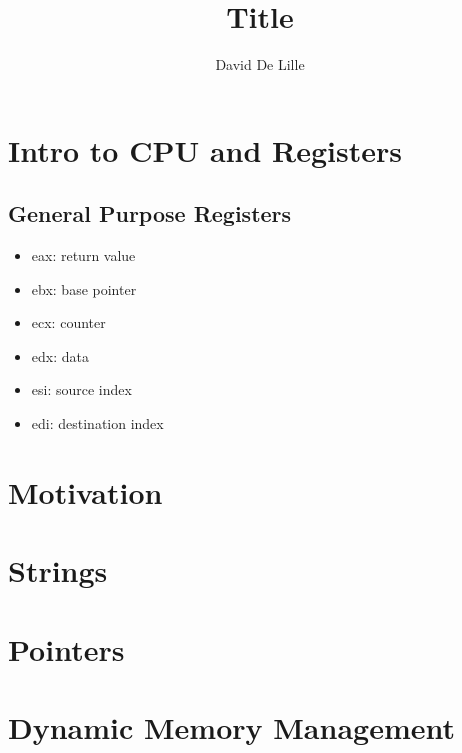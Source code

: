 \documentclass[letterpaper]{article}
\author{David De Lille}
\title{Title}
\begin{document}
\maketitle

\section{Intro to CPU and Registers}
\subsection{General Purpose Registers}
\begin{itemize}
\item eax: return value
\item ebx: base pointer
\item ecx: counter
\item edx: data
\item esi: source index
\item edi: destination index
\end{itemize}

\section{Motivation}

\section{Strings}

\section{Pointers}

\section{Dynamic Memory Management}
\end{document}
